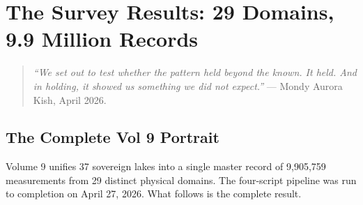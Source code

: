 \documentclass[11pt, letterpaper, openany]{book}
\begin{document}
\clearpage

\chapter{The Survey Results: 29 Domains, 9.9 Million Records}

\begin{quote}
\textit{``We set out to test whether the pattern held beyond the known. It held.
And in holding, it showed us something we did not expect.''} --- Mondy Aurora
Kish, April 2026.
\end{quote}

\section{The Complete Vol 9 Portrait}

Volume 9 unifies 37 sovereign lakes into a single master record of 9,905,759
measurements from 29 distinct physical domains. The four-script pipeline was run
to completion on April 27, 2026. What follows is the complete result.
\end{document}
